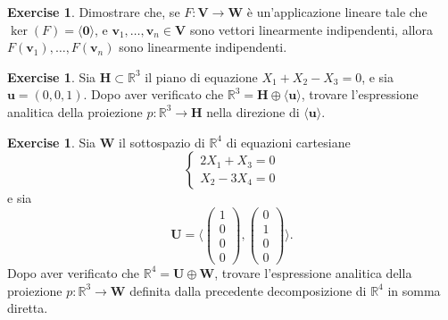 \documentclass{article}
\theoremstyle{plain}
\theoremstyle{definition}
\newtheorem{xca}[exmp]{Exercise}
\theoremstyle{remark}
\begin{document}
\vspace{10pt}

\begin{bxthm}
\begin{xca}
    Dimostrare che, se $F:\mathbf{V}\to\mathbf{W}$ è un'applicazione lineare tale che $\ker(F)=\langle\mathbf{0}\rangle$, e $\mathbf{v}_1,\ldots,\mathbf{v}_n\in\mathbf{V}$ sono vettori linearmente indipendenti, allora $F(\mathbf{v}_1),\ldots,F(\mathbf{v}_n)$ sono linearmente indipendenti.
\end{xca}
\end{bxthm}

\vspace{10pt}

\begin{bxthm}
\begin{xca}
    Sia $\mathbf{H}\subset\mathbb{R}^3$ il piano di equazione $X_1+X_2-X_3=0$, e sia $\mathbf{u}=(0,0,1)$.
    Dopo aver verificato che $\mathbb{R}^3=\mathbf{H}\oplus\langle\mathbf{u}\rangle$, trovare l'espressione analitica della proiezione $p:\mathbb{R}^3\to \mathbf{H}$ nella direzione di $\langle\mathbf{u}\rangle$.
\end{xca}
\end{bxthm}

\vspace{10pt}

\begin{bxthm}
\begin{xca}
    Sia $\mathbf{W}$ il sottospazio di $\mathbb{R}^4$ di equazioni cartesiane
    \[\begin{cases}
        2X_1+X_3=0\\
        X_2-3X_4=0
    \end{cases}\]
    e sia 
    \[\mathbf{U}=\langle\begin{pmatrix}1\\0\\0\\0\end{pmatrix},\begin{pmatrix}0\\1\\0\\0\end{pmatrix}\rangle.\]
    Dopo aver verificato che $\mathbb{R}^4=\mathbf{U}\oplus\mathbf{W}$, trovare l'espressione analitica della proiezione $p:\mathbb{R}^3\to\mathbf{W}$ definita dalla precedente decomposizione di $\mathbb{R}^4$ in somma diretta.
\end{xca}
\end{bxthm}
\end{document}
